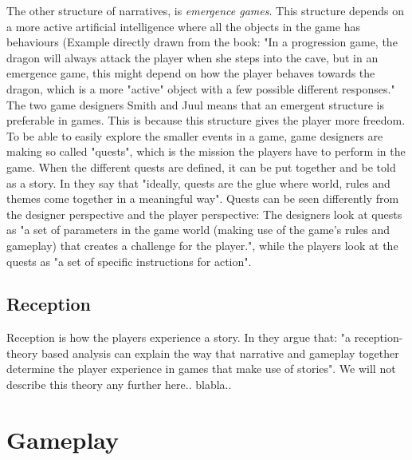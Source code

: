 The other structure of narratives, is \emph{emergence games}. This structure depends on a more active artificial intelligence where all the objects in the game has behaviours (Example directly drawn from the book: "In a progression game, the dragon will always attack the player when she steps into the cave, but in an emergence game, this might depend on how the player behaves towards the dragon, which is a more "active" object with a few possible different responses." The two game designers Smith and Juul means that an emergent structure is preferable in games. This is because this structure gives the player more freedom. To be able to easily explore the smaller events in a game, game designers are making so called "quests", which is the mission the players have to perform in the game. When the different quests are defined, it can be put together and be told as a story. In \cite{understandingvg} they say that "ideally, quests are the glue where world, rules and themes come together in a meaningful way". Quests can be seen differently from the designer perspective and the player perspective: The designers look at quests as "a set of parameters in the game world (making use of the game’s rules and gameplay) that creates a challenge for the player.", while the players look at the quests as "a set of specific instructions for action". 

\subsection{Reception}
Reception is how the players experience a story. In \cite{understandingvg} they argue that: "a reception-theory based analysis can explain the way that narrative and gameplay together determine the player experience in games that make use of stories". We will not describe this theory any further here.. blabla.. 

\section{Gameplay}

